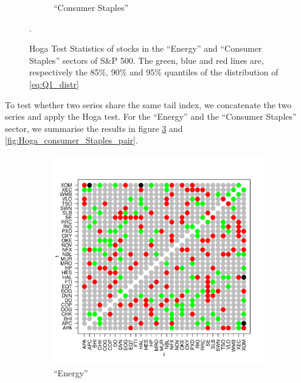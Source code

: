 \documentclass{article}
\begin{document}
\begin{figure}[htb!]
\begin{subfigure}[b]{0.5\linewidth}
    \caption{``Consumer Staples''}
    \label{fig:Hoga_consumer_Staples_Single}
  \end{subfigure}
  \caption{Hoga Test Statistics of stocks in the ``Energy'' and
    ``Consumer Staples'' sectors of
    S\&P 500. The green, blue and red lines are, respectively the
    85\%, 90\% and 95\% quantiles of the distribution of
    \eqref{eq:Q1_distr}}.
\end{figure}

To test whether two series share the same tail index, we concatenate
the two series and apply the Hoga test. For the ``Energy'' and the
``Consumer Staples'' sector, we summarise the results in figure
\ref{fig:Hoga_Energy_pair} and \ref{fig:Hoga_consumer_Staples_pair}.
\begin{figure}[htb!]
  \begin{subfigure}[b]{0.5\linewidth}
    \includegraphics[width=\textwidth]{Hoga_Energy_pair.pdf}
    \caption{``Energy''}
    \label{fig:Hoga_Energy_pair}
  \end{subfigure}
  \begin{subfigure}[b]{0.5\linewidth}

\end{subfigure}
\end{figure}
\end{document}
